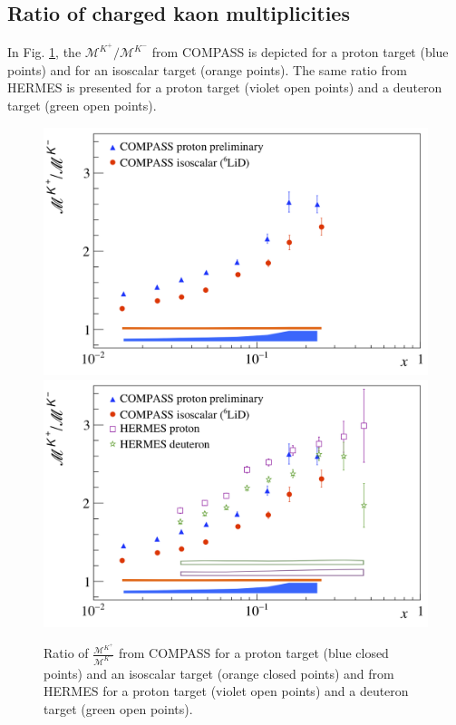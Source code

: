 \subsection{Ratio of charged kaon multiplicities}

In Fig. \ref{pic:kratio}, the $\mathscr{M}^{K^+}/\mathscr{M}^{K^-}$ from COMPASS is depicted for a proton target (blue points) and for an isoscalar target (orange points). The same ratio from HERMES is presented for a proton target (violet open points) and a deuteron target (green open points).

\begin{figure}[!h]
  \centering
	\includegraphics[scale=0.5]{./gfx/Kr_noH.png}
	\includegraphics[scale=0.5]{./gfx/Kr.png}
	\caption{Ratio of $\frac{\mathscr{M}^{K^+}}{\mathscr{M}^{K^-}}$ from COMPASS for a proton target (blue closed points) and an isoscalar target (orange closed points) and from HERMES for a proton target (violet open points) and a deuteron target (green open points).}
	\label{pic:kratio}
\end{figure}


